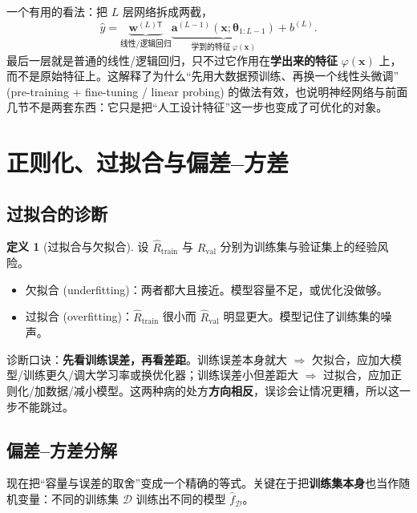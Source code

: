 \documentclass[UTF8,a4paper,11pt]{ctexart}
\theoremstyle{definition}
\newtheorem{definition}{定义}[section]
\theoremstyle{plain}
\theoremstyle{remark}
\newcommand{\D}{\mathcal{D}}
\newcommand{\eng}[1]{\textup{(#1)}}
\begin{document}
一个有用的看法：把 $L$ 层网络拆成两截，
\[
  \hat y=\underbrace{\bm{w}^{(L)\mathsf{T}}}_{\text{线性/逻辑回归}}\underbrace{\bm{a}^{(L-1)}(\bm{x};\bm{\theta}_{1:L-1})}_{\text{学到的特征}\ \varphi(\bm{x})}+b^{(L)} .
\]
最后一层就是普通的线性/逻辑回归，只不过它作用在\textbf{学出来的特征} $\varphi(\bm{x})$ 上，而不是原始特征上。这解释了为什么“先用大数据预训练、再换一个线性头微调” \eng{pre-training + fine-tuning / linear probing} 的做法有效，也说明神经网络与前面几节不是两套东西：它只是把“人工设计特征”这一步也变成了可优化的对象。

\section{正则化、过拟合与偏差--方差}\label{sec:reg}

\subsection{过拟合的诊断}

\begin{definition}[过拟合与欠拟合]\label{def:overfit}
设 $\hat R_{\text{train}}$ 与 $\hat R_{\text{val}}$ 分别为训练集与验证集上的经验风险。
\begin{itemize}
  \item 欠拟合 \eng{underfitting}：两者都大且接近。模型容量不足，或优化没做够。
  \item 过拟合 \eng{overfitting}：$\hat R_{\text{train}}$ 很小而 $\hat R_{\text{val}}$ 明显更大。模型记住了训练集的噪声。
\end{itemize}
\end{definition}

诊断口诀：\textbf{先看训练误差，再看差距}。训练误差本身就大 $\Rightarrow$ 欠拟合，应加大模型/训练更久/调大学习率或换优化器；训练误差小但差距大 $\Rightarrow$ 过拟合，应加正则化/加数据/减小模型。这两种病的处方\textbf{方向相反}，误诊会让情况更糟，所以这一步不能跳过。

\subsection{偏差--方差分解}

现在把“容量与误差的取舍”变成一个精确的等式。关键在于把\textbf{训练集本身}也当作随机变量：不同的训练集 $\D$ 训练出不同的模型 $\hat f_{\D}$。
\end{document}
